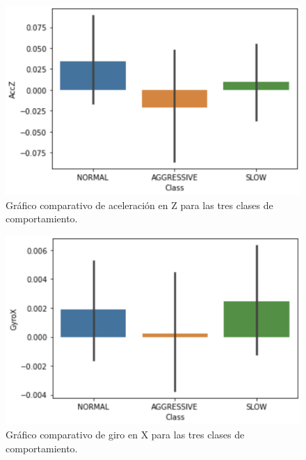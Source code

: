 \documentclass[runningheads]{llncs}
\begin{document}
    \begin{figure}
        \centering
        \includegraphics[width=1\columnwidth]{AccZ.png}
        \caption{Gráfico comparativo de aceleración en Z para las tres clases de comportamiento.}
        \label{fig:comand}%
    \end{figure}

    \begin{figure}
        \centering
        \includegraphics[width=1\columnwidth]{GyroX.png}
        \caption{Gráfico comparativo de giro en X para las tres clases de comportamiento.}
        \label{fig:comand}%
    \end{figure}
\end{document}
